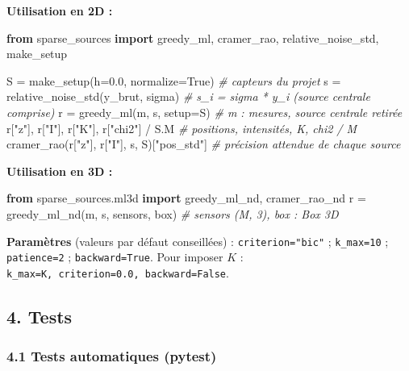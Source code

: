 \documentclass[
  french,
]{article}
\newenvironment{Shaded}{}{}
\newcommand{\CommentTok}[1]{\textcolor[rgb]{0.38,0.63,0.69}{\textit{#1}}}
\newcommand{\FloatTok}[1]{\textcolor[rgb]{0.25,0.63,0.44}{#1}}
\newcommand{\ImportTok}[1]{\textcolor[rgb]{0.00,0.50,0.00}{\textbf{#1}}}
\newcommand{\NormalTok}[1]{#1}
\newcommand{\OperatorTok}[1]{\textcolor[rgb]{0.40,0.40,0.40}{#1}}
\newcommand{\StringTok}[1]{\textcolor[rgb]{0.25,0.44,0.63}{#1}}
\newcommand{\VariableTok}[1]{\textcolor[rgb]{0.10,0.09,0.49}{#1}}
\begin{document}
\textbf{Utilisation en 2D :}

\begin{Shaded}
\begin{Highlighting}[]
\ImportTok{from}\NormalTok{ sparse\_sources }\ImportTok{import}\NormalTok{ greedy\_ml, cramer\_rao, relative\_noise\_std, make\_setup}

\NormalTok{S }\OperatorTok{=}\NormalTok{ make\_setup(h}\OperatorTok{=}\FloatTok{0.0}\NormalTok{, normalize}\OperatorTok{=}\VariableTok{True}\NormalTok{)       }\CommentTok{\# capteurs du projet}
\NormalTok{s }\OperatorTok{=}\NormalTok{ relative\_noise\_std(y\_brut, sigma)       }\CommentTok{\# s\_i = sigma * y\_i (source centrale comprise)}
\NormalTok{r }\OperatorTok{=}\NormalTok{ greedy\_ml(m, s, setup}\OperatorTok{=}\NormalTok{S)                }\CommentTok{\# m : mesures, source centrale retirée}
\NormalTok{r[}\StringTok{"z"}\NormalTok{], r[}\StringTok{"I"}\NormalTok{], r[}\StringTok{"K"}\NormalTok{], r[}\StringTok{"chi2"}\NormalTok{] }\OperatorTok{/}\NormalTok{ S.M     }\CommentTok{\# positions, intensités, K, chi2 / M}
\NormalTok{cramer\_rao(r[}\StringTok{"z"}\NormalTok{], r[}\StringTok{"I"}\NormalTok{], s, S)[}\StringTok{"pos\_std"}\NormalTok{] }\CommentTok{\# précision attendue de chaque source}
\end{Highlighting}
\end{Shaded}

\textbf{Utilisation en 3D :}

\begin{Shaded}
\begin{Highlighting}[]
\ImportTok{from}\NormalTok{ sparse\_sources.ml3d }\ImportTok{import}\NormalTok{ greedy\_ml\_nd, cramer\_rao\_nd}
\NormalTok{r }\OperatorTok{=}\NormalTok{ greedy\_ml\_nd(m, s, sensors, box)        }\CommentTok{\# sensors (M, 3), box : Box 3D}
\end{Highlighting}
\end{Shaded}

\textbf{Paramètres} (valeurs par défaut conseillées) :
\texttt{criterion="bic"} ; \texttt{k\_max=10} ; \texttt{patience=2} ;
\texttt{backward=True}. Pour imposer \(K\) :
\texttt{k\_max=K,\ criterion=0.0,\ backward=False}.

\subsection{4. Tests}\label{tests}

\subsubsection{4.1 Tests automatiques
(pytest)}\label{tests-automatiques-pytest}
\end{document}
